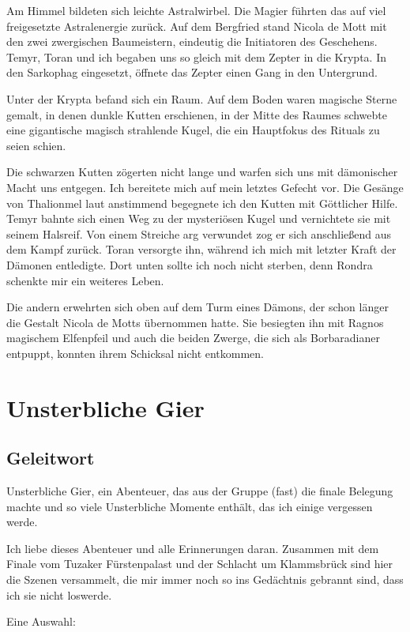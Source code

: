 Am Himmel bildeten sich leichte Astralwirbel. Die Magier führten das auf viel freigesetzte Astralenergie zurück. Auf dem Bergfried stand Nicola de Mott mit den zwei zwergischen Baumeistern, eindeutig die Initiatoren des Geschehens. Temyr, Toran und ich begaben uns so gleich mit dem Zepter in die Krypta. In den Sarkophag eingesetzt, öffnete das Zepter einen Gang in den Untergrund.

Unter der Krypta befand sich ein Raum. Auf dem Boden waren magische Sterne gemalt, in denen dunkle Kutten erschienen, in der Mitte des Raumes schwebte eine gigantische magisch strahlende Kugel, die ein Hauptfokus des Rituals zu seien schien.

Die schwarzen Kutten zögerten nicht lange und warfen sich uns mit dämonischer Macht uns entgegen. Ich bereitete mich auf mein letztes Gefecht vor. Die Gesänge von Thalionmel laut anstimmend begegnete ich den Kutten mit Göttlicher Hilfe. Temyr bahnte sich einen Weg zu der mysteriösen Kugel und vernichtete sie mit seinem Halsreif. Von einem Streiche arg verwundet zog er sich anschließend aus dem Kampf zurück. Toran versorgte ihn, während ich mich mit letzter Kraft der Dämonen entledigte. Dort unten sollte ich noch nicht sterben, denn Rondra schenkte mir ein weiteres Leben.

Die andern erwehrten sich oben auf dem Turm eines Dämons, der schon länger die Gestalt Nicola de Motts übernommen hatte. Sie besiegten ihn mit Ragnos magischem Elfenpfeil und auch die beiden Zwerge, die sich als Borbaradianer entpuppt, konnten ihrem Schicksal nicht entkommen. 

\chapter{Unsterbliche Gier}

\section{Geleitwort}
Unsterbliche Gier, ein Abenteuer, das aus der Gruppe (fast) die finale  Belegung machte und so viele Unsterbliche Momente enthält, das ich einige vergessen werde.

Ich liebe dieses Abenteuer und alle Erinnerungen daran. Zusammen mit dem Finale vom Tuzaker Fürstenpalast und der Schlacht um Klammsbrück sind hier die Szenen versammelt, die mir immer noch so ins Gedächtnis gebrannt sind, dass ich sie nicht loswerde.

Eine Auswahl:

